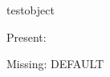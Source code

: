 \documentclass[12pt]{pnpprep}
\begin{document}
\begin{blueprint}{testobject}

    \begin{render}
        \namevalue
        \par

            {Present: \testvaluevalue}

            {Missing: DEFAULT}

        \par
    \end{render}
\end{blueprint}


\begin{testobject}
\end{testobject}


\begin{testobject}
\end{testobject}
\end{document}
